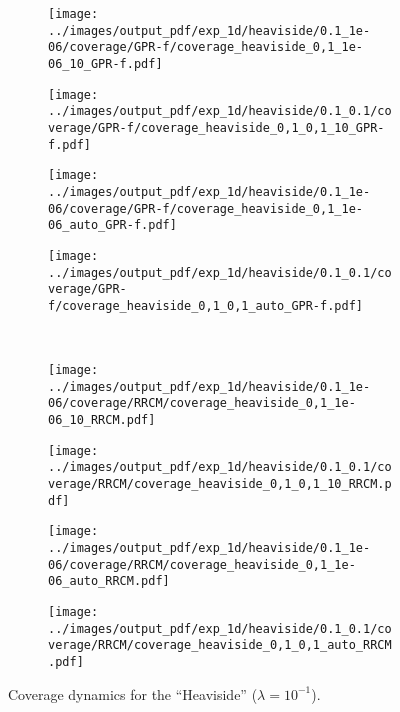 \documentclass[10pt, conference, compsocconf]{IEEEtran}
\begin{document}
\begin{figure}%
  \centering
  \begin{subfigure}[b]{0.25\linewidth}
    \texttt{[image: ../images/output\_pdf/exp\_1d/heaviside/0.1\_1e-06/coverage/GPR-f/coverage\_heaviside\_0,1\_1e-06\_10\_GPR-f.pdf]}
  \end{subfigure}%
  \begin{subfigure}[b]{0.25\linewidth}
    \texttt{[image: ../images/output\_pdf/exp\_1d/heaviside/0.1\_0.1/coverage/GPR-f/coverage\_heaviside\_0,1\_0,1\_10\_GPR-f.pdf]}
  \end{subfigure}%
  \begin{subfigure}[b]{0.25\linewidth}
    \texttt{[image: ../images/output\_pdf/exp\_1d/heaviside/0.1\_1e-06/coverage/GPR-f/coverage\_heaviside\_0,1\_1e-06\_auto\_GPR-f.pdf]}
  \end{subfigure}%
  \begin{subfigure}[b]{0.25\linewidth}
    \texttt{[image: ../images/output\_pdf/exp\_1d/heaviside/0.1\_0.1/coverage/GPR-f/coverage\_heaviside\_0,1\_0,1\_auto\_GPR-f.pdf]}
  \end{subfigure}\\
  \begin{subfigure}[b]{0.25\linewidth}
    \texttt{[image: ../images/output\_pdf/exp\_1d/heaviside/0.1\_1e-06/coverage/RRCM/coverage\_heaviside\_0,1\_1e-06\_10\_RRCM.pdf]}
  \end{subfigure}%
  \begin{subfigure}[b]{0.25\linewidth}
    \texttt{[image: ../images/output\_pdf/exp\_1d/heaviside/0.1\_0.1/coverage/RRCM/coverage\_heaviside\_0,1\_0,1\_10\_RRCM.pdf]}
  \end{subfigure}%
  \begin{subfigure}[b]{0.25\linewidth}
    \texttt{[image: ../images/output\_pdf/exp\_1d/heaviside/0.1\_1e-06/coverage/RRCM/coverage\_heaviside\_0,1\_1e-06\_auto\_RRCM.pdf]}
  \end{subfigure}%
  \begin{subfigure}[b]{0.25\linewidth}
    \texttt{[image: ../images/output\_pdf/exp\_1d/heaviside/0.1\_0.1/coverage/RRCM/coverage\_heaviside\_0,1\_0,1\_auto\_RRCM.pdf]}
  \end{subfigure}
  \caption{Coverage dynamics for the ``Heaviside'' ($\lambda=10^{-1}$).}
  \label{fig:heaviside_1d_high_noise}
\end{figure}
\end{document}
